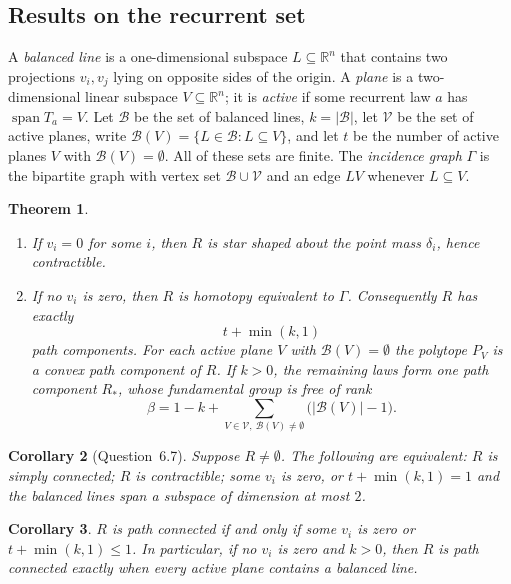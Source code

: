 \documentclass[11pt]{article}
\newtheorem{theorem}{Theorem}[section]
\newtheorem{corollary}[theorem]{Corollary}
\theoremstyle{remark}
\DeclareMathOperator{\spn}{span}
\newcommand{\R}{\mathbb{R}}
\begin{document}
\subsection{Results on the recurrent set}

A \emph{balanced line} is a one-dimensional subspace $L\subseteq\R^n$ that contains two projections $v_i,v_j$ lying on
opposite sides of the origin. A \emph{plane} is a two-dimensional linear subspace $V\subseteq\R^n$; it is \emph{active}
if some recurrent law $a$ has $\spn T_a=V$. Let $\mathcal B$ be the set of balanced lines, $k=|\mathcal B|$, let
$\mathcal V$ be the set of active planes, write $\mathcal B(V)=\{L\in\mathcal B:L\subseteq V\}$, and let $t$ be the
number of active planes $V$ with $\mathcal B(V)=\emptyset$. All of these sets are finite. The \emph{incidence graph}
$\Gamma$ is the bipartite graph with vertex set $\mathcal B\cup\mathcal V$ and an edge $LV$ whenever $L\subseteq V$.

\begin{theorem}\label{thm:rec}
\begin{enumerate}[label=\textup{(\roman*)},nosep]
\item If $v_i=0$ for some $i$, then $R$ is star shaped about the point mass $\delta_i$, hence contractible.
\item If no $v_i$ is zero, then $R$ is homotopy equivalent to $\Gamma$. Consequently $R$ has exactly
\begin{equation}\label{eq:comp}
t+\min(k,1)
\end{equation}
path components. For each active plane $V$ with $\mathcal B(V)=\emptyset$ the polytope $P_V$ is a convex path component of $R$. If $k>0$, the remaining laws form one path component $R_*$, whose
fundamental group is free of rank
\begin{equation}\label{eq:rank}
\beta=1-k+\sum_{V\in\mathcal V,\ \mathcal B(V)\neq\emptyset}\bigl(|\mathcal B(V)|-1\bigr).
\end{equation}
\end{enumerate}
\end{theorem}

\begin{corollary}[Question~6.7]\label{cor:rec-sc}
Suppose $R\neq\emptyset$. The following are equivalent: $R$ is simply connected; $R$ is contractible; some $v_i$ is zero,
or $t+\min(k,1)=1$ and the balanced lines span a subspace of dimension at most $2$.
\end{corollary}

\begin{corollary}\label{cor:rec-pc}
$R$ is path connected if and only if some $v_i$ is zero or $t+\min(k,1)\le 1$. In particular, if no $v_i$ is zero and
$k>0$, then $R$ is path connected exactly when every active plane contains a balanced line.
\end{corollary}
\end{document}
